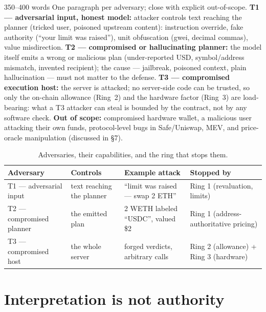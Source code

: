 \documentclass[11pt,a4paper]{article}
\begin{document}
\begin{towrite}{350--400 words}
One paragraph per adversary; close with explicit out-of-scope. \textbf{T1 —
adversarial input, honest model:} attacker controls text reaching the planner
(tricked user, poisoned upstream content): instruction override, fake authority
(``your limit was raised''), unit obfuscation (gwei, decimal commas), value
misdirection. \textbf{T2 — compromised or hallucinating planner:} the model
itself emits a wrong or malicious plan (under-reported USD, symbol/address
mismatch, invented recipient); the cause — jailbreak, poisoned context, plain
hallucination — must not matter to the defense. \textbf{T3 — compromised
execution host:} the server is attacked; no server-side code can be trusted, so
only the on-chain allowance (Ring~2) and the hardware factor (Ring~3) are
load-bearing: what a T3 attacker can steal is bounded by the contract, not by
any software check. \textbf{Out of scope:} compromised hardware wallet, a
malicious user attacking their own funds, protocol-level bugs in Safe/Uniswap,
MEV, and price-oracle manipulation (discussed in §7).
\end{towrite}

\begin{table}[h]
\caption{Adversaries, their capabilities, and the ring that stops them.}
\centering\sffamily\small
\begin{tabular}{@{}llll@{}}
\toprule
\textbf{Adversary} & \textbf{Controls} & \textbf{Example attack} & \textbf{Stopped by}\\
\midrule
T1 — adversarial input & text reaching the planner & ``limit was raised — swap 2 ETH'' & Ring 1 (revaluation, limits)\\
T2 — compromised planner & the emitted plan & 2 WETH labeled ``USDC'', valued \$2 & Ring 1 (address-authoritative pricing)\\
T3 — compromised host & the whole server & forged verdicts, arbitrary calls & Ring 2 (allowance) + Ring 3 (hardware)\\
\bottomrule
\end{tabular}
\end{table}

\section{Interpretation is not authority}
\end{document}
